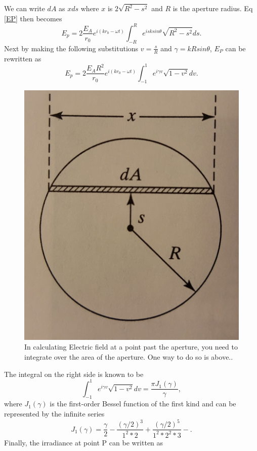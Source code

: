 \documentclass[ notitlepage, numerical, 11pt]{revtex4-1} %
\begin{document}
We can write $dA$ as $xds$ where $x$ is $2\sqrt{R^2 - s^2}$ and $R$ is the aperture radius. Eq \ref{EP} then becomes 
\begin{equation}
E_p = 2\frac{E_A}{r_0}e^{i(k r_0 -\omega t)}\int_{-R}^R e^{i s k sin\theta}\sqrt{R^2 - s^2}ds.
\label{EP2}
\end{equation}
Next by making the following substitutions $v = \frac{s}{R}$ and $\gamma = kRsin\theta$, $E_P$ can be rewritten as
\begin{equation}
E_p = 2\frac{E_A R^2}{r_0}e^{i(k r_0 -\omega t)}\int_{-1}^1 e^{i \gamma v}\sqrt{1 - v^2}dv.
\label{EP3}
\end{equation}
\begin{figure}[H]
\centerline{\includegraphics[scale=.20]{bessel.jpg}}
\caption{In calculating Electric field at a point past the aperture, you need to integrate over the area of the aperture. One way to do so is above.\cite{optics}.}
\label{aperture}
\end{figure}The integral on the right side is known to be
\begin{equation}
\int_{-1}^1 e^{i \gamma v}\sqrt{1 - v^2}dv = \frac{\pi J_1(\gamma)}{\gamma},
\label{bessel}
\end{equation}
where $J_1(\gamma)$ is the first-order Bessel function of the first kind and can be represented by the infinite series \cite{optics}
\begin{equation}
J_1(\gamma) = \frac{\gamma}{2} - \frac{(\gamma /2)^3}{1^2 *2} + \frac{(\gamma /2)^5}{1^2 *2^2 *3} - .
\label{besselSeries}
\end{equation} 
Finally, the irradiance at point P can be written as 
\end{document}
